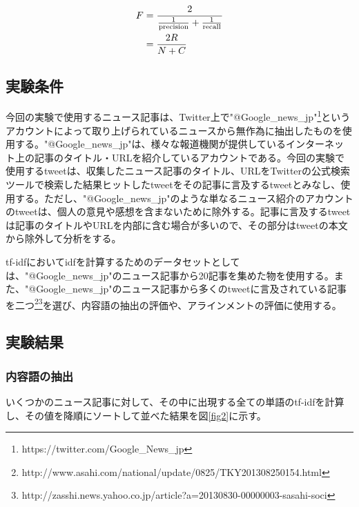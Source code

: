 \documentclass[12pt]{jarticle}
\begin{document}
\begin{align}
  F &= \frac{2}{\frac{1}{\rm precision} + \frac{1}{\rm recall}} \\
    &= \frac{2R}{N+C}
\end{align}


\subsection{実験条件}
今回の実験で使用するニュース記事は、Twitter上で"@Google\_news\_jp"\footnote{https://twitter.com/Google\_News\_jp}というアカウントによって取り上げられているニュースから無作為に抽出したものを使用する。"@Google\_news\_jp"は、様々な報道機関が提供しているインターネット上の記事のタイトル・URLを紹介しているアカウントである。今回の実験で使用するtweetは、収集したニュース記事のタイトル、URLをTwitterの公式検索ツールで検索した結果ヒットしたtweetをその記事に言及するtweetとみなし、使用する。ただし、"@Google\_news\_jp"のような単なるニュース紹介のアカウントのtweetは、個人の意見や感想を含まないために除外する。記事に言及するtweetは記事のタイトルやURLを内部に含む場合が多いので、その部分はtweetの本文から除外して分析をする。

tf-idfにおいてidfを計算するためのデータセットとしては、"@Google\_news\_jp"のニュース記事から20記事を集めた物を使用する。また、"@Google\_news\_jp"のニュース記事から多くのtweetに言及されている記事を二つ\footnote{http://www.asahi.com/national/update/0825/TKY201308250154.html}\footnote{http://zasshi.news.yahoo.co.jp/article?a=20130830-00000003-sasahi-soci}を選び、内容語の抽出の評価や、アラインメントの評価に使用する。

\subsection{実験結果}
\subsubsection{内容語の抽出}

いくつかのニュース記事に対して、その中に出現する全ての単語のtf-idfを計算し、その値を降順にソートして並べた結果を図\ref{fig2}に示す。
\end{document}
